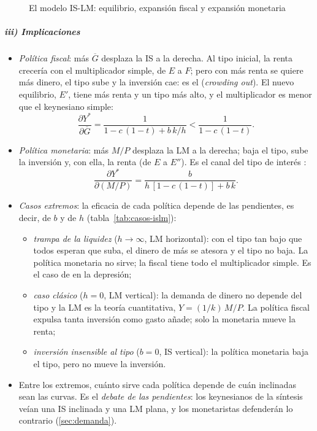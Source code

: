 \documentclass[11pt]{article}
\begin{document}
\begin{figure}[H]
\centering
\caption{El modelo IS-LM: equilibrio, expansión fiscal y expansión monetaria}\label{fig:is-lm}
\end{figure}

\subparagraph{iii) Implicaciones}

\begin{itemize}
\item \emph{Política fiscal}: más $\overline{G}$ desplaza la IS a la derecha. Al tipo inicial, la renta crecería con el multiplicador simple, de $E$ a $F$; pero con más renta se quiere más dinero, el tipo sube y la inversión cae: es el  (\emph{crowding out}). El nuevo equilibrio, $E'$, tiene más renta y un tipo más alto, y el multiplicador es menor que el keynesiano simple:
  \begin{equation}
  \frac{\partial Y^*}{\partial\overline{G}}=\frac{1}{1-c\,(1-t)+b\,k/h}<\frac{1}{1-c\,(1-t)}. \label{eq:multiplicador-fiscal}
  \end{equation}
\item \emph{Política monetaria}: más $M/P$ desplaza la LM a la derecha; baja el tipo, sube la inversión y, con ella, la renta (de $E$ a $E''$). Es el canal del tipo de interés :
  \begin{equation}
  \frac{\partial Y^*}{\partial(M/P)}=\frac{b}{h\,[1-c\,(1-t)]+b\,k}. \label{eq:multiplicador-monetario}
  \end{equation}
\item \emph{Casos extremos}: la eficacia de cada política depende de las pendientes, es decir, de $b$ y de $h$ (tabla~\ref{tab:casos-islm}):
  \begin{itemize}
  \item \emph{trampa de la liquidez} ($h\to\infty$, LM horizontal): con el tipo tan bajo que todos esperan que suba, el dinero de más se atesora y el tipo no baja. La política monetaria no sirve; la fiscal tiene todo el multiplicador simple. Es el caso de  en la depresión;
  \item \emph{caso clásico} ($h=0$, LM vertical): la demanda de dinero no depende del tipo y la LM es la teoría cuantitativa, $Y=(1/k)\,M/P$. La política fiscal expulsa tanta inversión como gasto añade; solo la monetaria mueve la renta;
  \item \emph{inversión insensible al tipo} ($b=0$, IS vertical): la política monetaria baja el tipo, pero no mueve la inversión.
  \end{itemize}
\item Entre los extremos, cuánto sirve cada política depende de cuán inclinadas sean las curvas. Es el \emph{debate de las pendientes}: los keynesianos de la síntesis veían una IS inclinada y una LM plana, y los monetaristas defenderán lo contrario (\ref{sec:demanda}).
\end{itemize}
\end{document}
